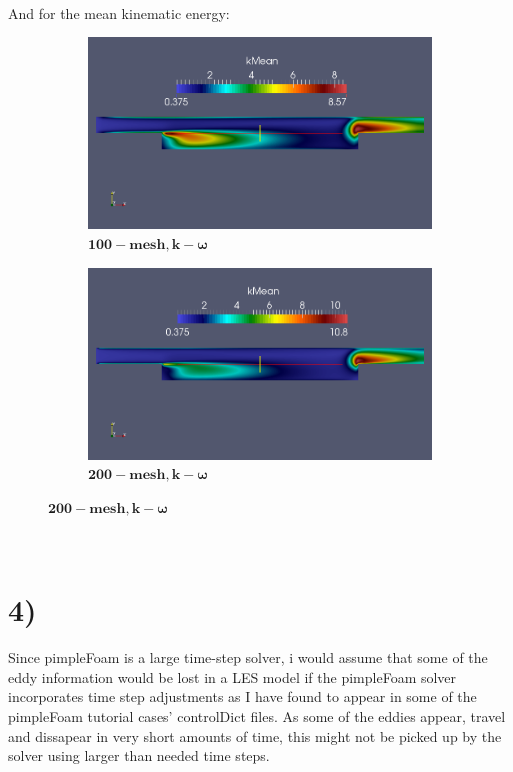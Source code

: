 \documentclass[a4paper,english,11pt,twoside]{article}
\begin{document}
\\
And for the mean kinematic energy:\\
\begin{figure}[h!]
	\begin{subfigure}{0.5\textwidth}
		\includegraphics[width=0.95\linewidth]{simple_ko_10_mean_k.png}
		\caption{$\mathbf{ 100-mesh, k-\omega}$}
	\end{subfigure}
	\begin{subfigure}{0.5\textwidth}
		\includegraphics[width=0.95\linewidth]{simple_ko_20_mean_k.png}
		\caption{$\mathbf{ 200-mesh, k-\omega}$}
	\end{subfigure}
\end{figure}
\\
\section*{4)}
Since pimpleFoam is a large time-step solver, i would assume that some of the eddy information would be lost in a LES model if the pimpleFoam solver incorporates time step adjustments as I have found to appear in some of the pimpleFoam tutorial cases' controlDict files. As some of the eddies appear, travel and dissapear in very short amounts of time, this might not be picked up by the solver using larger than needed time steps.
\end{document}
